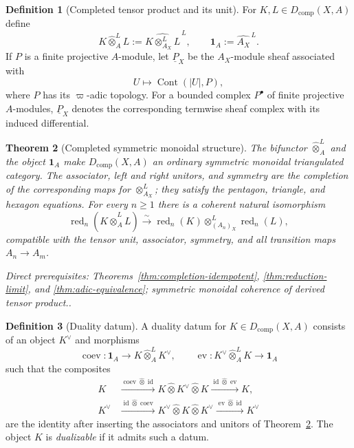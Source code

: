 \documentclass[10pt]{article}
\newtheorem{theorem}{Theorem}[section]
\theoremstyle{definition}
\newtheorem{definition}[theorem]{Definition}
\newcommand{\depends}[1]{\par\smallskip\noindent\textit{Direct prerequisites:} #1.}
\begin{document}
\begin{definition}[Completed tensor product and its unit]
\label{def:completed-tensor}
For $K,L\in D_{\mathrm{comp}}(X,A)$ define
\[
 K\widehat\otimes_A^LL
 :=\widehat{K\otimes^L_{A_X}L}^{\,L},
 \qquad
 \mathbf1_A:=\widehat{A_X}^{\,L}.
\]
If $P$ is a finite projective $A$-module, let $\underline P_X$ be the
$A_X$-module sheaf associated with
\[
 U\longmapsto\operatorname{Cont}(|U|,P),
\]
where $P$ has its $\varpi$-adic topology.  For a bounded complex $P^\bullet$
of finite projective $A$-modules, $\underline P_X$ denotes the corresponding
termwise sheaf complex with its induced differential.
\end{definition}

\begin{theorem}[Completed symmetric monoidal structure]
\label{thm:completed-monoidal}
The bifunctor $\widehat\otimes_A^L$ and the object $\mathbf1_A$ make
$D_{\mathrm{comp}}(X,A)$ an ordinary symmetric monoidal triangulated
category.  The associator, left and right unitors, and symmetry are the
completion of the corresponding maps for $\otimes^L_{A_X}$; they satisfy
the pentagon, triangle, and hexagon equations.  For every $n\geq1$ there is
a coherent natural isomorphism
\[
 \operatorname{red}_n(K\widehat\otimes_A^LL)
 \xrightarrow{\sim}
 \operatorname{red}_n(K)\otimes^L_{(A_n)_X}
 \operatorname{red}_n(L),
\]
compatible with the tensor unit, associator, symmetry, and all transition
maps $A_n\to A_m$.
\depends{Theorems~\ref{thm:completion-idempotent},
\ref{thm:reduction-limit}, and \ref{thm:adic-equivalence}; symmetric
monoidal coherence of derived tensor product.}
\end{theorem}

\begin{definition}[Duality datum]
\label{def:duality-datum}
A duality datum for $K\in D_{\mathrm{comp}}(X,A)$ consists of an object
$K^\vee$ and morphisms
\[
 \operatorname{coev}:\mathbf1_A\longrightarrow
 K\widehat\otimes_A^LK^\vee,
 \qquad
 \operatorname{ev}:K^\vee\widehat\otimes_A^LK
 \longrightarrow\mathbf1_A
\]
such that the composites
\[
\begin{aligned}
 K&\xrightarrow{\operatorname{coev}\widehat\otimes\operatorname{id}}
 K\widehat\otimes K^\vee\widehat\otimes K
 \xrightarrow{\operatorname{id}\widehat\otimes\operatorname{ev}}K,\\
 K^\vee&\xrightarrow{\operatorname{id}\widehat\otimes\operatorname{coev}}
 K^\vee\widehat\otimes K\widehat\otimes K^\vee
 \xrightarrow{\operatorname{ev}\widehat\otimes\operatorname{id}}K^\vee
\end{aligned}
\]
are the identity after inserting the associators and unitors of
Theorem~\ref{thm:completed-monoidal}.  The object $K$ is
\emph{dualizable} if it admits such a datum.
\end{definition}
\end{document}
